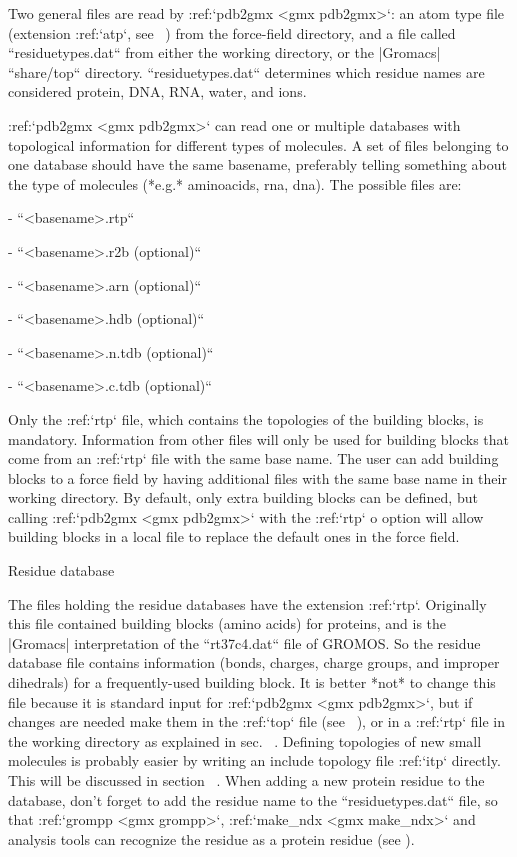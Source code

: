 Two general files are read by :ref:`pdb2gmx <gmx pdb2gmx>`: an atom type file
(extension :ref:`atp`, see 
) from the force-field directory, and a file called
``residuetypes.dat`` from either the working directory, or
the |Gromacs| ``share/top`` directory.
``residuetypes.dat`` determines which residue names are
considered protein, DNA, RNA, water, and ions.

:ref:`pdb2gmx <gmx pdb2gmx>` can read one or multiple databases with
topological information for different types of molecules. A set of files
belonging to one database should have the same basename, preferably
telling something about the type of molecules (*e.g.* aminoacids, rna,
dna). The possible files are:

-  ``<basename>.rtp``

-  ``<basename>.r2b (optional)``

-  ``<basename>.arn (optional)``

-  ``<basename>.hdb (optional)``

-  ``<basename>.n.tdb (optional)``

-  ``<basename>.c.tdb (optional)``

Only the :ref:`rtp` file, which contains the topologies of the
building blocks, is mandatory. Information from other files will only be
used for building blocks that come from an :ref:`rtp` file
with the same base name. The user can add building blocks to a force
field by having additional files with the same base name in their
working directory. By default, only extra building blocks can be
defined, but calling :ref:`pdb2gmx <gmx pdb2gmx>` with the
:ref:`rtp` o option will allow building blocks in a local file
to replace the default ones in the force field.

Residue database
~~~~~~~~~~~~~~~~

The files holding the residue databases have the extension
:ref:`rtp`. Originally this file contained building blocks
(amino acids) for proteins, and is the |Gromacs| interpretation of the
``rt37c4.dat`` file of GROMOS. So the residue database file
contains information (bonds, charges, charge groups, and improper
dihedrals) for a frequently-used building block. It is better *not* to
change this file because it is standard input for
:ref:`pdb2gmx <gmx pdb2gmx>`, but if changes are needed make them in the
:ref:`top` file (see 
), or
in a :ref:`rtp` file in the working directory as explained in
sec. 
. Defining topologies of new
small molecules is probably easier by writing an include topology file
:ref:`itp` directly. This will be discussed in
section 
. When adding a new protein
residue to the database, don’t forget to add the residue name to the
``residuetypes.dat``
file, so that :ref:`grompp <gmx grompp>`, :ref:`make_ndx <gmx make_ndx>` and
analysis tools can recognize the residue as a protein residue (see
).

